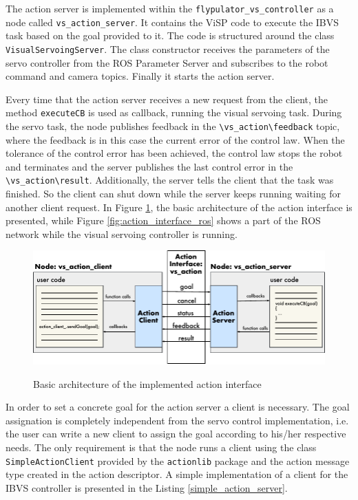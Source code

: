 
The action server is implemented within the \texttt{flypulator\_vs\_controller} as a node called \texttt{vs\_action\_server}. It contains the ViSP code to execute the IBVS task based on the goal provided to it. The code is structured around the class \texttt{VisualServoingServer}. The class constructor receives the parameters of the servo controller from the ROS Parameter Server and subscribes to the robot command and camera topics. Finally it starts the action server.

Every time that the action server receives a new request from the client, the method \texttt{executeCB} is used as callback, running the visual servoing task. During the servo task, the node publishes feedback in the \texttt{\textbackslash vs\_action\textbackslash feedback} topic, where the feedback is in this case the current error of the control law. When the tolerance of the control error has been achieved, the control law stops the robot and terminates and the server publishes the last control error in the \texttt{\textbackslash vs\_action\textbackslash result}. Additionally, the server tells the client that the task was finished. So the client can shut down while the server keeps running waiting for another client request. In Figure \ref{fig:action_interface}, the basic architecture of the action interface is presented, while Figure \ref{fig:action_interface_ros} shows a part of the ROS network while the visual servoing controller is running.

\begin{figure}[!htb]
	\caption{Basic architecture of the implemented action interface}
	\centering
	\includegraphics[width=\textwidth]{content/chapter_05/images/action_interface.pdf}
	\label{fig:action_interface}
\end{figure}

In order to set a concrete goal for the action server a client is necessary. The goal assignation is completely independent from the servo control implementation, i.e. the user can write a new client to assign the goal according to his/her respective needs. The only requirement is that the node runs a client using the class \texttt{SimpleActionClient} provided by the \texttt{actionlib} package and the action message type created in the action descriptor. A simple implementation of a client for the IBVS controller is presented in the Listing \ref{simple_action_server}.

